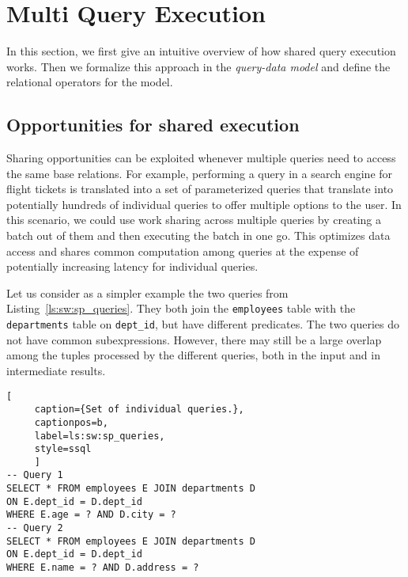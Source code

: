 \section{Multi Query Execution}
\label{sec:sw}

In this section, we first give an intuitive overview of how shared query
execution works.  Then we formalize this approach in the \emph{query-data model}
and define the relational operators for the model.

\subsection{Opportunities for shared execution}
\label{sec:opps_sexecution}

Sharing opportunities can be exploited whenever multiple queries need to access
the same base relations.  For example, performing a query in a search engine for
flight tickets is translated into a set of parameterized queries that
translate into potentially hundreds of individual queries \cite{Giannikis:2010:CRE:1807167.1807326} to offer
multiple options to the user.
In this scenario, we
could use work sharing across multiple queries by 
creating a batch out of them and then executing the batch in
one go. This optimizes data access and shares common computation among queries
at the expense of potentially increasing latency for individual queries.

Let us consider as a simpler example the two queries from Listing~\ref{ls:sw:sp_queries}.  They both
join the \lstinline[style=sql]{employees} table with the
\lstinline[style=sql]{departments} table on \lstinline[style=sql]{dept_id}, but
have different predicates.  
The two queries do not have common subexpressions.  However, there may still be
a large overlap among the tuples processed by the different queries, both in the
input and in intermediate results.

\begin{lstlisting}[
     caption={Set of individual queries.},
     captionpos=b,
     label=ls:sw:sp_queries,
     style=ssql
     ]
-- Query 1
SELECT * FROM employees E JOIN departments D
ON E.dept_id = D.dept_id
WHERE E.age = ? AND D.city = ?
-- Query 2
SELECT * FROM employees E JOIN departments D
ON E.dept_id = D.dept_id
WHERE E.name = ? AND D.address = ?
\end{lstlisting}


